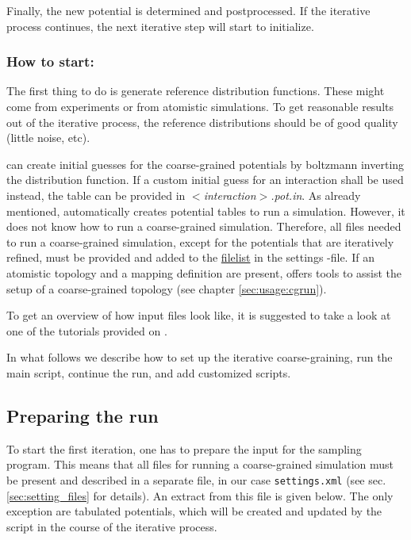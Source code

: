 Finally, the new potential is determined and postprocessed. If the iterative process continues, the next iterative step will start to initialize.

\subsubsection*{How to start:}

The first thing to do is generate reference distribution functions. These might come from experiments or from atomistic simulations. To get reasonable results out of the iterative process, the reference distributions should be of good quality (little noise, etc).

\votca can create initial guesses for the coarse-grained
potentials by boltzmann inverting the distribution function. If a custom initial
guess for an interaction shall be used instead, the table can be provided in
\textit{$<$interaction$>$.pot.in}. As already mentioned, \votca automatically creates potential tables to run a simulation. However, it does not know how to run a coarse-grained simulation. Therefore, all files needed to run a coarse-grained simulation, except for the potentials that are iteratively refined, must be provided and added to the \hyperlink{\cgref{inverse.filelist}}{filelist} in the settings \xml-file. If an atomistic topology and a mapping definition are present, \votca offers tools to assist the setup of a  coarse-grained topology (see chapter \ref{sec:usage:cgrun}).

To get an overview of how input files look like, it is suggested to take a look at one of the tutorials provided on \votcaweb.

In what follows we describe how to set up the iterative coarse-graining, run the main script, continue the run, and add customized scripts.

\subsection{Preparing the run}
\label{sec:preparing_the_run}
To start the first iteration, one has to prepare the input for the sampling program. This means that all files for running a coarse-grained simulation must be present and described in a separate \xml file, in our case \texttt{settings.xml} (see sec. \ref{sec:setting_files} for details). An extract from this file is given below. The only exception are tabulated potentials, which will be created and updated by the script in the course of the iterative process.

